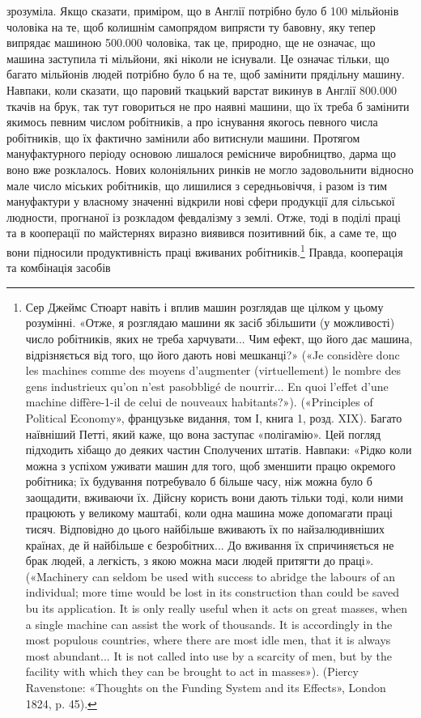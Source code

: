 зрозуміла. Якщо сказати, приміром, що в Англії потрібно було б
100 мільйонів чоловіка на те, щоб колишнім самопрядом випрясти
ту бавовну, яку тепер випрядає машиною 500.000 чоловіка, так це,
природно, ще не означає, що машина заступила ті мільйони, які
ніколи не існували. Це означає тільки, що багато мільйонів
людей потрібно було б на те, щоб замінити прядільну машину.
Навпаки, коли сказати, що паровий ткацький варстат викинув
в Англії 800.000 ткачів на брук, так тут говориться не про наявні
машини, що їх треба б замінити якимось певним числом робітників,
а про існування якогось певного числа робітників, що їх
фактично замінили або витиснули машини. Протягом мануфактурного
періоду основою лишалося ремісниче виробництво, дарма
що воно вже розклалось. Нових колоніяльних ринків не могло
задовольнити відносно мале число міських робітників, що лишилися
з середньовіччя, і разом із тим мануфактури у власному
значенні відкрили нові сфери продукції для сільської людности,
прогнаної із розкладом февдалізму з землі. Отже, тоді в поділі
праці та в кооперації по майстернях виразно виявився позитивний
бік, а саме те, що вони підносили продуктивність праці вживаних
робітників.\footnote{
Сер Джеймс Стюарт навіть і вплив машин розглядав ще цілком у
цьому розумінні. «Отже, я розглядаю машини як засіб збільшити (у можливості)
число робітників, яких не треба харчувати... Чим ефект, що його
дає машина, відрізняється від того, що його дають нові мешканці?»
(«Je considère donc les machines comme des moyens d’augmenter (virtuellement)
le nombre des gens industrieux qu’on n’est pasobbligé de nourrir...
En quoi l’effet d’une machine diffère-1-il de celui de nouveaux habitants?»).
(«Principles of Political Economy», французьке видання, том І, книга 1,
розд. XIX). Багато наївніший Петті, який каже, що вона заступає «полігамію».
Цей погляд підходить хібащо до деяких частин Сполучених штатів.
Навпаки: «Рідко коли можна з успіхом уживати машин для того, щоб
зменшити працю окремого робітника; їх будування потребувало б більше
часу, ніж можна було б заощадити, вживаючи їх. Дійсну користь вони
дають тільки тоді, коли ними працюють у великому маштабі, коли одна
машина може допомагати праці тисяч. Відповідно до цього найбільше
вживають їх по найзалюдивніших країнах, де й найбільше є безробітних...
До вживання їх спричиняється не брак людей, а легкість, з якою можна
маси людей притягти до праці». («Machinery can seldom be used with success
to abridge the labours of an individual; more time would be lost in its
construction than could be saved bu its application. It is only really useful
when it acts on great masses, when a single machine can assist the work
of thousands. It is accordingly in the most populous countries, where there
are most idle men, that it is always most abundant... It is not called into
use by a scarcity of men, but by the facility with which they can be
brought to act in masses»). (Piercy Ravenstone: «Thoughts on the Funding
System and its Effects», London 1824, p. 45).
} Правда, кооперація та комбінація засобів
